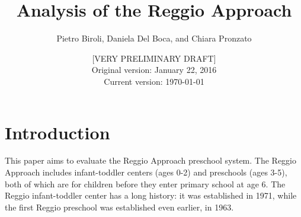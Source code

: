 \documentclass[12pt]{article}
\begin{document}
\title{Analysis of the Reggio Approach} %
\author{Pietro Biroli, Daniela Del Boca, and Chiara Pronzato}
\date{[VERY PRELIMINARY DRAFT] \\
Original version: January 22, 2016 \\
Current version: \today }

\maketitle



\bigskip

\doublespacing

\section{Introduction}\label{sec:intro}

This paper aims to evaluate the Reggio Approach preschool system. The Reggio Approach includes infant-toddler centers (ages 0-2) and preschools (ages 3-5), both of which are for children before they enter primary school at age 6. The Reggio infant-toddler center has a long history: it was established in 1971, while the first Reggio preschool was established even earlier, in 1963.
\end{document}
